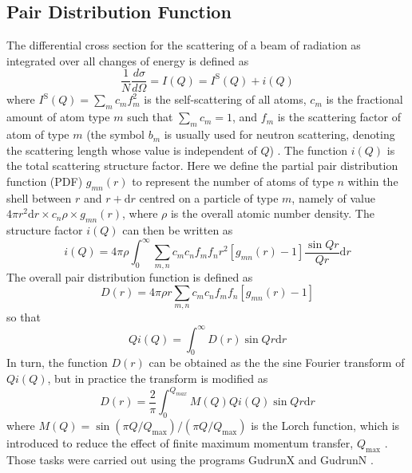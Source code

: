 \documentclass[twoside,twocolumn,9pt]{article}
\begin{document}
\subsection{Pair Distribution Function}
The differential cross section for the scattering of a beam of radiation as integrated over all changes of energy is defined as
\begin{equation}
\frac{1}{N}\frac{d\sigma}{d\Omega}=I(Q)=I^\mathrm{S}(Q)+i(Q)
\end{equation}
where $I^\mathrm{S}(Q)=  \sum_m c_m f_m^2 $ is the self-scattering of all atoms, $c_m$ is the fractional amount of atom type $m$ such that $\sum_m c_m = 1$, and $f_m$ is the scattering factor of atom of type $m$ (the symbol $b_m$ is usually used for neutron scattering, denoting the scattering length whose value is independent of $Q$) \cite{Keen:2001wc}. The function $i(Q)$ is the total scattering structure factor. Here we define the partial pair distribution function (PDF) $g_{mn}(r)$ to represent the number of atoms of type $n$ within the shell between $r$ and  $r+\mathrm{d}r$ centred on a particle of type $m$, namely of value $4 \pi r^2 \mathrm{d}r \times c_n \rho \times g_{mn}(r)$,  where $\rho$ is the overall atomic number density. The structure factor $i(Q)$ can then be written as \cite{Dove2002}
\begin{equation}
i(Q)=4\pi\rho\int^{\infty}_{0}\sum_{m,n}c_m c_n f_m f_n r^2 [g_{mn}(r)-1]\frac{\sin{Qr}}{Qr} \mathrm{d}r
\end{equation}
 The overall pair distribution function is defined as
\begin{equation}\label{fun:dofr_0}
D(r)=4\pi\rho r \sum_{m,n}c_m c_n f_m f_n [g_{mn}(r)-1]
\end{equation}
so that
\begin{equation}
Qi(Q)=\int^{\infty}_{0} D(r) \sin{Qr} \mathrm{d}r
\end{equation}
In turn, the function $D(r)$ can be obtained as the the sine Fourier transform of $Qi(Q)$, but in practice the transform is modified as
\begin{equation}\label{fun:dofr_1}
D(r)=\frac{2}{\pi}\int^{Q_{max}}_{0} M(Q)Qi(Q)\sin{Qr} \mathrm{d}r
\end{equation}
where $M(Q) = \sin(\pi Q/Q_\mathrm{max})/(\pi Q/Q_\mathrm{max})$ is the Lorch function, which is introduced to reduce the effect of finite maximum momentum transfer, $Q_\mathrm{max}$ \cite{Lorch:1969js, Dove2002, Soper:2012kr}. Those tasks were carried out using the programs GudrunX and GudrunN \cite{Soper:2011fda,Soper:2012vs}.
\end{document}
